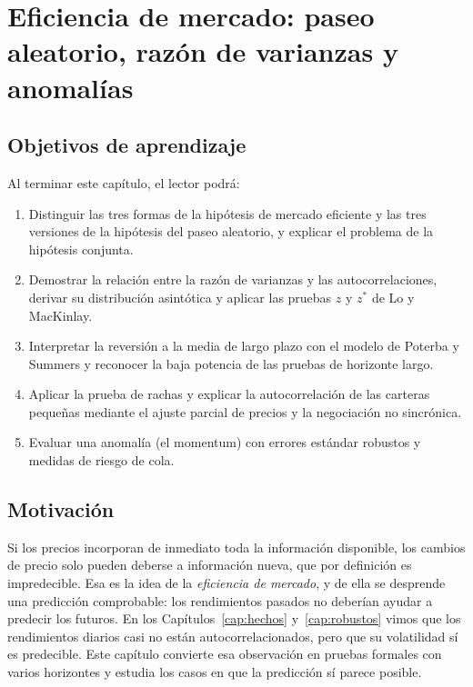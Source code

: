 \chapter[Eficiencia de mercado]{Eficiencia de mercado: paseo aleatorio, razón de varianzas y anomalías}\label{cap:eficiencia}

\section*{Objetivos de aprendizaje}
Al terminar este capítulo, el lector podrá:
\begin{enumerate}[label=\arabic*.,leftmargin=*]
  \item Distinguir las tres formas de la hipótesis de mercado eficiente y las tres versiones de la hipótesis
        del paseo aleatorio, y explicar el problema de la hipótesis conjunta.
  \item Demostrar la relación entre la razón de varianzas y las autocorrelaciones, derivar su distribución
        asintótica y aplicar las pruebas $z$ y $z^*$ de Lo y MacKinlay.
  \item Interpretar la reversión a la media de largo plazo con el modelo de Poterba y Summers y reconocer la
        baja potencia de las pruebas de horizonte largo.
  \item Aplicar la prueba de rachas y explicar la autocorrelación de las carteras pequeñas mediante el ajuste
        parcial de precios y la negociación no sincrónica.
  \item Evaluar una anomalía (el momentum) con errores estándar robustos y medidas de riesgo de cola.
\end{enumerate}

\section*{Motivación}
Si los precios incorporan de inmediato toda la información disponible, los cambios de precio solo pueden
deberse a información nueva, que por definición es impredecible. Esa es la idea de la \emph{eficiencia de
mercado}, y de ella se desprende una predicción comprobable: los rendimientos pasados no deberían ayudar a
predecir los futuros. En los Capítulos~\ref{cap:hechos} y~\ref{cap:robustos} vimos que los rendimientos diarios
casi no están autocorrelacionados, pero que su volatilidad sí es predecible. Este capítulo convierte esa
observación en pruebas formales con varios horizontes y estudia los casos en que la predicción sí parece posible.

